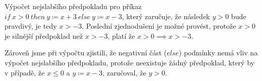 Výpočet nejslabšího předpokladu pro příkaz $if \ x > 0 \ then \ y \coloneqq x + 3 \ else \ y \coloneqq x - 3$,
který zaručuje, že následek $y > 0$ bude pravdivý, je tedy $x > -3$.
Poslední zjednodušení je možné provést, protože $x > 0$ je silnější předpoklad než $x > -3$,
platí že $x > 0 \implies x > -3$.

Zároveň jsme při výpočtu zjistili, že negativní část ($else$) podmínky nemá vliv na výpočet nejslabšího předpokladu,
protože neexistuje žádný předpoklad, který by v případě, že $x \leq 0$ a $y \coloneqq x - 3$, zaručoval, že $y > 0$.

